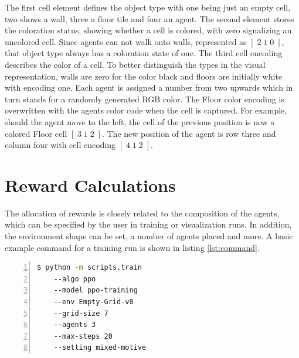 
The first cell element defines the object type with one being just an empty cell, two shows a wall, three a floor tile and four an agent. The second element stores the coloration status, showing whether a cell is colored, with zero signalizing an uncolored cell. Since agents can not walk onto walls, represented as $[\;2\;1\;0\;]$, that object type always has a coloration state of one. The third cell encoding describes the color of a cell. To better distinguish the types in the visual representation, walls are zero for the color black and floors are initially white with encoding one. Each agent is assigned a number from two upwards which in turn stands for a randomly generated RGB color. The Floor color encoding is overwritten with the agents color code when the cell is captured. For example, should the agent move to the left, the cell of the previous position is now a colored Floor cell $[\;3\;1\;2\;]$. The new position of the agent is row three and column four with cell encoding $[\;4\;1\;2\;]$.

\section{Reward Calculations}\label{reward_calculations}
The allocation of rewards is closely related to the composition of the agents, which can be specified by the user in training or visualization runs. In addition, the environment shape can be set, a number of agents placed and more. A basic example command for a training run is shown in listing \ref{lst:command}.

\begin{lstlisting}[float=htp,caption=Exemplary command to execute training with three agents in a coloring environment using PPO as algorithm,label=lst:command,language=bash, numbers=left, numberstyle=\tiny, numbersep=8pt ,xleftmargin=3ex,xrightmargin=1ex]
$ python -m scripts.train
    --algo ppo
    --model ppo-training
    --env Empty-Grid-v0 
    --grid-size 7
    --agents 3 
    --max-steps 20
    --setting mixed-motive
\end{lstlisting}

